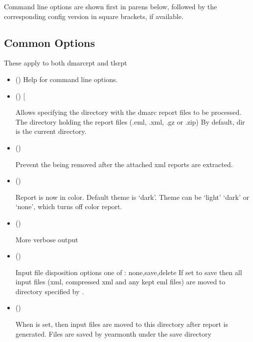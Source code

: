 \documentclass[letterpaper,10pt,english]{sphinxmanual}
\begin{document}
\sphinxAtStartPar
Command line options are shown first in parens below, followed by
the corresponding config version in square brackets, if available.


\subsection{Common Options}
\label{\detokenize{README:common-options}}
\sphinxAtStartPar
These apply to both dmarc\sphinxhyphen{}rpt and tls\sphinxhyphen{}rpt
\begin{itemize}
\item {} 
\sphinxAtStartPar
()
Help for command line options.

\item {} 
\sphinxAtStartPar
() {[}\sphinxstyleemphasis{dir = /path/xxx/}{]}

\sphinxAtStartPar
Allows specifying the directory with the dmarc report files to be processed.
The directory holding the report files (.eml, .xml, .gz or .zip)
By default, dir is the current directory.

\item {} 
\sphinxAtStartPar
()

\sphinxAtStartPar
Prevent the  being removed after the attached xml reports are extracted.

\item {} 
\sphinxAtStartPar
()

\sphinxAtStartPar
Report is now in color.
Default theme is ‘dark’. Theme can be ‘light’ ‘dark’ or ‘none’, which turns off color report.

\item {} 
\sphinxAtStartPar
()

\sphinxAtStartPar
More verbose output

\item {} 
\sphinxAtStartPar
()

\sphinxAtStartPar
Input file disposition options one of : none,save,delete
If set to save then all input files (xml, compressed xml and any kept eml files) are moved
to directory specified by .

\item {} 
\sphinxAtStartPar
()

\sphinxAtStartPar
When  is set, then input files are moved to this directory after report
is generated.  Files are saved by year\sphinxhyphen{}month under the save directory

\end{itemize}
\end{document}
